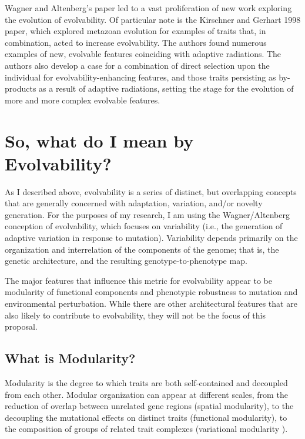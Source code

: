 \documentclass[PhD]{msu-thesis}
\begin{document}
Wagner and Altenberg’s paper led to a vast proliferation of new work exploring the evolution of evolvability. Of particular note is the Kirschner and Gerhart 1998 paper\cite{kirschner_evolvability_1998}, which explored metazoan evolution for examples of traits that, in combination, acted to increase evolvability. The authors found numerous examples of new, evolvable features coinciding with adaptive radiations. The authors also develop a case for a combination of direct selection upon the individual for evolvability-enhancing features, and those traits persisting as by-products as a result of adaptive radiations, setting the stage for the evolution of more and more complex evolvable features.




\section{So, what do I mean by Evolvability?}
As I described above, evolvability is a series of distinct, but overlapping concepts that are generally concerned with adaptation, variation, and/or novelty generation. For the purposes of my research, I am using the Wagner/Altenberg conception of evolvability, which focuses on variability (i.e., the generation of adaptive variation in response to mutation). Variability depends primarily on the organization and interrelation of the components of the genome; that is, the genetic architecture, and the resulting genotype-to-phenotype map.

The major features that influence this metric for evolvability appear to be modularity of functional components and phenotypic robustness to mutation and environmental perturbation. While there are other architectural features that are also likely to contribute to evolvability, they will not be the focus of this proposal.



\subsection{What is Modularity?}
Modularity is the degree to which traits are both self-contained and decoupled from each other. Modular organization can appear at different scales, from the reduction of overlap between unrelated gene regions (spatial modularity\cite{misevic_sexual_2006}), to the decoupling the mutational effects on distinct traits (functional modularity\cite{gunter_p._wagner_perspective:_1996}), to the composition of groups of related trait complexes (variational modularity \cite{gunter_p._wagner_pleiotropic_2011,ravasz_hierarchical_2002}).
\end{document}
